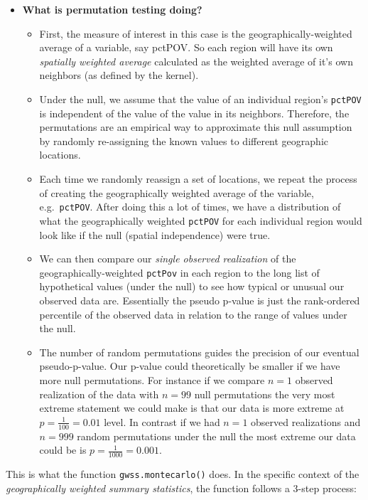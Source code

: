 \documentclass[
]{book}
\newcommand{\passthrough}[1]{#1}
\providecommand{\tightlist}{%
  \setlength{\itemsep}{0pt}\setlength{\parskip}{0pt}}
\newenvironment{rmdblock}[1]
  {%
  \begin{itemize}
  \renewcommand{\labelitemi}{
    \raisebox{-.7\height}[0pt][0pt]{
      {\setkeys{Gin}{width=3em,keepaspectratio}\texttt{[image: images/\#1]}}
    }
  }
  \item
  }
  {
  \end{itemize}
  }
\newenvironment{rmdnote}
  {\begin{rmdblock}{note}}
  {\end{rmdblock}}
\begin{document}
\begin{rmdnote}
\textbf{What is permutation testing doing?}

\begin{itemize}
\tightlist
\item
  First, the measure of interest in this case is the geographically-weighted average of a variable, say pctPOV. So each region will have its own \emph{spatially weighted average} calculated as the weighted average of it's own neighbors (as defined by the kernel).
\item
  Under the null, we assume that the value of an individual region's \passthrough{\lstinline!pctPOV!} is independent of the value of the value in its neighbors. Therefore, the permutations are an empirical way to approximate this null assumption by randomly re-assigning the known values to different geographic locations.
\item
  Each time we randomly reassign a set of locations, we repeat the process of creating the geographically weighted average of the variable, e.g.~\passthrough{\lstinline!pctPOV!}. After doing this a lot of times, we have a distribution of what the geographically weighted \passthrough{\lstinline!pctPOV!} for each individual region would look like if the null (spatial independence) were true.
\item
  We can then compare our \emph{single observed realization} of the geographically-weighted \passthrough{\lstinline!pctPov!} in each region to the long list of hypothetical values (under the null) to see how typical or unusual our observed data are. Essentially the pseudo p-value is just the rank-ordered percentile of the observed data in relation to the range of values under the null.
\item
  The number of random permutations guides the precision of our eventual pseudo-p-value. Our p-value could theoretically be smaller if we have more null permutations. For instance if we compare \(n=1\) observed realization of the data with \(n=99\) null permutations the very most extreme statement we could make is that our data is more extreme at \(p = \frac{1}{100} = 0.01\) level. In contrast if we had \(n=1\) observed realizations and \(n=999\) random permutations under the null the most extreme our data could be is \(p = \frac{1}{1000} = 0.001\).
  \end{rmdnote}
\end{itemize}

This is what the function \passthrough{\lstinline!gwss.montecarlo()!} does. In the specific context of the \emph{geographically weighted summary statistics}, the function follows a 3-step process:
\end{document}
